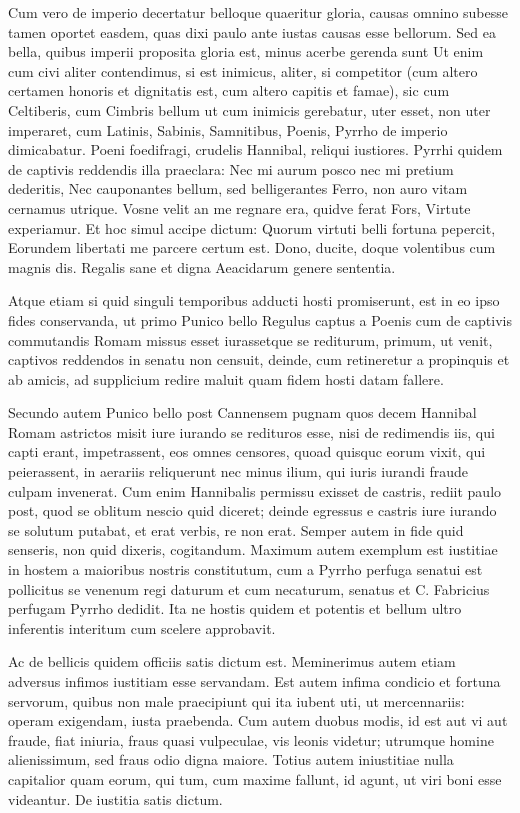  Cum vero de imperio decertatur belloque quaeritur gloria, causas omnino subesse tamen oportet easdem, quas dixi paulo ante iustas causas esse bellorum. Sed ea bella, quibus imperii proposita gloria est, minus acerbe gerenda sunt Ut enim cum civi aliter contendimus, si est inimicus, aliter, si competitor (cum altero certamen honoris et dignitatis est, cum altero capitis et famae), sic cum Celtiberis, cum Cimbris bellum ut cum inimicis gerebatur, uter esset, non uter imperaret, cum Latinis, Sabinis, Samnitibus, Poenis, Pyrrho de imperio dimicabatur. Poeni foedifragi, crudelis Hannibal, reliqui iustiores. Pyrrhi quidem de captivis reddendis illa praeclara: Nec mi aurum posco nec mi pretium dederitis, Nec cauponantes bellum, sed belligerantes Ferro, non auro vitam cernamus utrique. Vosne velit an me regnare era, quidve ferat Fors, Virtute experiamur. Et hoc simul accipe dictum: Quorum virtuti belli fortuna pepercit, Eorundem libertati me parcere certum est. Dono, ducite, doque volentibus cum magnis dis. Regalis sane et digna Aeacidarum genere sententia.

 Atque etiam si quid singuli temporibus adducti hosti promiserunt, est in eo ipso fides conservanda, ut primo Punico bello Regulus captus a Poenis cum de captivis commutandis Romam missus esset iurassetque se rediturum, primum, ut venit, captivos reddendos in senatu non censuit, deinde, cum retineretur a propinquis et ab amicis, ad supplicium redire maluit quam fidem hosti datam fallere.

 Secundo autem Punico bello post Cannensem pugnam quos decem Hannibal Romam astrictos misit iure iurando se redituros esse, nisi de redimendis iis, qui capti erant, impetrassent, eos omnes censores, quoad quisquc eorum vixit, qui peierassent, in aerariis reliquerunt nec minus ilium, qui iuris iurandi fraude culpam invenerat. Cum enim Hannibalis permissu exisset de castris, rediit paulo post, quod se oblitum nescio quid diceret; deinde egressus e castris iure iurando se solutum putabat, et erat verbis, re non erat. Semper autem in fide quid senseris, non quid dixeris, cogitandum. Maximum autem exemplum est iustitiae in hostem a maioribus nostris constitutum, cum a Pyrrho perfuga senatui est pollicitus se venenum regi daturum et cum necaturum, senatus et C. Fabricius perfugam Pyrrho dedidit. Ita ne hostis quidem et potentis et bellum ultro inferentis interitum cum scelere approbavit.

 Ac de bellicis quidem officiis satis dictum est. Meminerimus autem etiam adversus infimos iustitiam esse servandam. Est autem infima condicio et fortuna servorum, quibus non male praecipiunt qui ita iubent uti, ut mercennariis: operam exigendam, iusta praebenda. Cum autem duobus modis, id est aut vi aut fraude, fiat iniuria, fraus quasi vulpeculae, vis leonis videtur; utrumque homine alienissimum, sed fraus odio digna maiore. Totius autem iniustitiae nulla capitalior quam eorum, qui tum, cum maxime fallunt, id agunt, ut viri boni esse videantur. De iustitia satis dictum.

